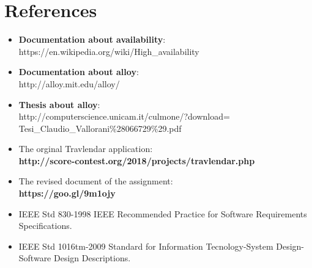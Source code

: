 \documentclass[numbers=noenddot, 12pt, a4paper, oneside]{scrbook}
\begin{document}
\chapter{References}

\begin{itemize}
	\item \textbf{Documentation about availability}:\\ https://en.wikipedia.org/wiki/High\_availability
	\item \textbf{Documentation about alloy}:\\ http://alloy.mit.edu/alloy/
	\item \textbf{Thesis about alloy}:\\ http://computerscience.unicam.it/culmone/?download=\\Tesi\_Claudio\_Vallorani\%28066729\%29.pdf
	\item The orginal Travlendar application: \\
	\textbf{http://score-contest.org/2018/projects/travlendar.php}
	\item The revised document of the assignment:\\
	\textbf{https://goo.gl/9m1ojy}
	\item IEEE Std 830-1998 IEEE Recommended Practice for Software Requirements Specifications. 
	\item IEEE Std 1016tm-2009 Standard for Information Tecnology-System Design-Software Design Descriptions.
\end{itemize}
\end{document}
